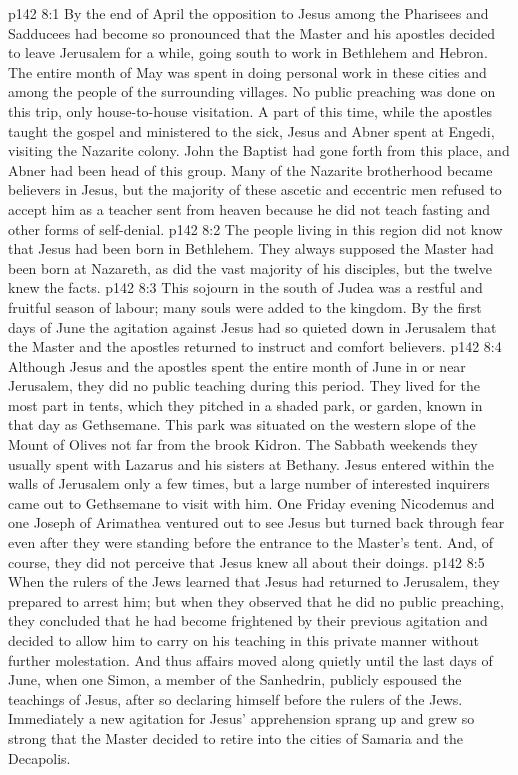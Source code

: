 \vs p142 8:1 By the end of April the opposition to Jesus among the Pharisees and Sadducees had become so pronounced that the Master and his apostles decided to leave Jerusalem for a while, going south to work in Bethlehem and Hebron. The entire month of May was spent in doing personal work in these cities and among the people of the surrounding villages. No public preaching was done on this trip, only house\hyp{}to\hyp{}house visitation. A part of this time, while the apostles taught the gospel and ministered to the sick, Jesus and Abner spent at Engedi, visiting the Nazarite colony. John the Baptist had gone forth from this place, and Abner had been head of this group. Many of the Nazarite brotherhood became believers in Jesus, but the majority of these ascetic and eccentric men refused to accept him as a teacher sent from heaven because he did not teach fasting and other forms of self\hyp{}denial.
\vs p142 8:2 The people living in this region did not know that Jesus had been born in Bethlehem. They always supposed the Master had been born at Nazareth, as did the vast majority of his disciples, but the twelve knew the facts.
\vs p142 8:3 This sojourn in the south of Judea was a restful and fruitful season of labour; many souls were added to the kingdom. By the first days of June the agitation against Jesus had so quieted down in Jerusalem that the Master and the apostles returned to instruct and comfort believers.
\vs p142 8:4 Although Jesus and the apostles spent the entire month of June in or near Jerusalem, they did no public teaching during this period. They lived for the most part in tents, which they pitched in a shaded park, or garden, known in that day as Gethsemane. This park was situated on the western slope of the Mount of Olives not far from the brook Kidron. The Sabbath weekends they usually spent with Lazarus and his sisters at Bethany. Jesus entered within the walls of Jerusalem only a few times, but a large number of interested inquirers came out to Gethsemane to visit with him. One Friday evening Nicodemus and one Joseph of Arimathea ventured out to see Jesus but turned back through fear even after they were standing before the entrance to the Master’s tent. And, of course, they did not perceive that Jesus knew all about their doings.
\vs p142 8:5 When the rulers of the Jews learned that Jesus had returned to Jerusalem, they prepared to arrest him; but when they observed that he did no public preaching, they concluded that he had become frightened by their previous agitation and decided to allow him to carry on his teaching in this private manner without further molestation. And thus affairs moved along quietly until the last days of June, when one Simon, a member of the Sanhedrin, publicly espoused the teachings of Jesus, after so declaring himself before the rulers of the Jews. Immediately a new agitation for Jesus’ apprehension sprang up and grew so strong that the Master decided to retire into the cities of Samaria and the Decapolis.
\quizlink
